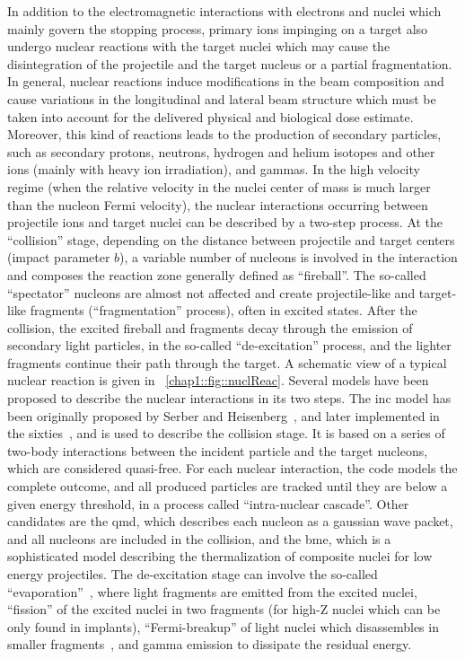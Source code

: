In addition to the electromagnetic interactions with electrons and nuclei   which mainly govern the stopping process, primary ions impinging on a target also undergo nuclear reactions with the target nuclei which may cause the disintegration of the projectile and the target nucleus or a partial fragmentation. In general, nuclear reactions induce modifications in the beam composition and cause variations in the longitudinal and lateral beam structure which must be taken into account for the delivered physical and biological dose estimate. Moreover, this kind of reactions leads to the production of secondary particles, such as secondary protons, neutrons, hydrogen and helium isotopes and other ions (mainly with heavy ion irradiation), and gammas.
In the high velocity regime (when the relative velocity in the nuclei center of mass is much larger than the nucleon Fermi velocity), the nuclear interactions occurring between projectile ions and target nuclei can be described by a two-step process. At the \enquote{collision} stage, depending on the distance between projectile and target centers (impact parameter $b$), a variable number of nucleons is involved in the interaction and composes the reaction zone generally defined as \enquote{fireball}. The so-called \enquote{spectator} nucleons are almost not affected and create projectile-like and target-like fragments (\enquote{fragmentation} process), often in excited states. After the collision, the excited fireball and fragments decay through the emission of secondary light particles, in the so-called \enquote{de-excitation} process, and the lighter fragments continue their path through the target. A schematic view of a typical nuclear reaction is given in \figurename~\ref{chap1::fig::nuclReac}. 
Several models have been proposed to describe the nuclear interactions in its two steps. The \gls{inc} model has been originally proposed by Serber and Heisenberg~\parencite{Serber1947}, and later implemented in the sixties~\parencite{Bertini1974}, and is used to describe the collision stage. It is based on a series of two-body interactions between the incident particle and the target nucleons, which are considered quasi-free. For each nuclear interaction, the code models the complete outcome, and all produced particles are tracked until they are below a given energy threshold, in a process called \enquote{intra-nuclear cascade}. Other candidates are the \gls{qmd}, which describes each nucleon as a gaussian wave packet, and all nucleons are included in the collision, and the \gls{bme}, which is a sophisticated model describing the thermalization of composite nuclei for low energy projectiles. The de-excitation stage can involve the so-called \enquote{evaporation}~\parencite{Weisskopf1937}, where light fragments are emitted from the excited nuclei, \enquote{fission} of the excited nuclei in two fragments (for high-Z nuclei which can be only found in implants), \enquote{Fermi-breakup} of light nuclei which disassembles in smaller fragments~\parencite{Fermi1950}, and gamma emission to dissipate the residual energy. 
